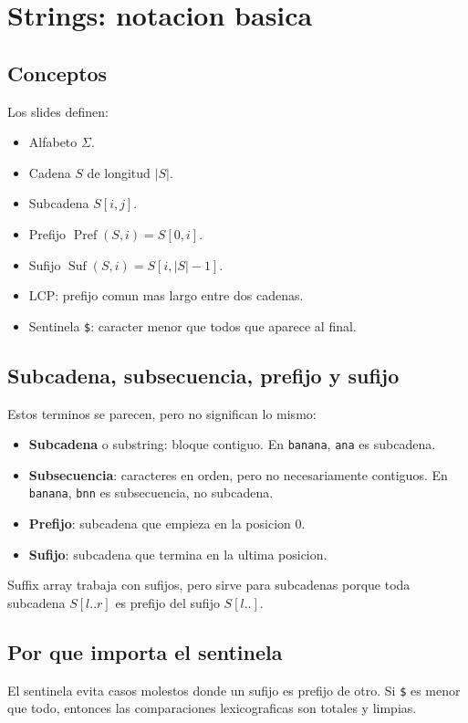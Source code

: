 \documentclass[10pt]{article}
\newcommand{\Suf}{\operatorname{Suf}}
\newcommand{\Pref}{\operatorname{Pref}}
\begin{document}
\newpage
\section{Strings: notacion basica}

\subsection{Conceptos}
Los slides definen:
\begin{itemize}[leftmargin=*]
\item Alfabeto $\Sigma$.
\item Cadena $S$ de longitud $|S|$.
\item Subcadena $S[i,j]$.
\item Prefijo $\Pref(S,i)=S[0,i]$.
\item Sufijo $\Suf(S,i)=S[i,|S|-1]$.
\item LCP: prefijo comun mas largo entre dos cadenas.
\item Sentinela \texttt{\$}: caracter menor que todos que aparece al final.
\end{itemize}

\subsection{Subcadena, subsecuencia, prefijo y sufijo}
Estos terminos se parecen, pero no significan lo mismo:
\begin{itemize}[leftmargin=*]
\item \textbf{Subcadena} o substring: bloque contiguo. En \texttt{banana},
\texttt{ana} es subcadena.
\item \textbf{Subsecuencia}: caracteres en orden, pero no necesariamente
contiguos. En \texttt{banana}, \texttt{bnn} es subsecuencia, no subcadena.
\item \textbf{Prefijo}: subcadena que empieza en la posicion $0$.
\item \textbf{Sufijo}: subcadena que termina en la ultima posicion.
\end{itemize}
Suffix array trabaja con sufijos, pero sirve para subcadenas porque toda
subcadena $S[l..r]$ es prefijo del sufijo $S[l..]$.

\subsection{Por que importa el sentinela}
El sentinela evita casos molestos donde un sufijo es prefijo de otro. Si
\texttt{\$} es menor que todo, entonces las comparaciones lexicograficas son
totales y limpias.
\end{document}
